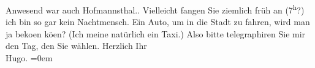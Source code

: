 \begin{ledgroupsized}[t]{13cm}
{{{                     Anwesend war auch Hofmannsthal.}}}\label{K_L02457_1h}. Vielleicht
                  {\pb}fangen Sie ziemlich früh an
                     (7\textsuperscript{h}?) ich bin so gar kein Nachtmensch.\pend
           \pstart
           Ein Auto, um in die Stadt zu fahren, wird man ja beko{\geminationm}en
                  kö{\geminationn}en? (Ich meine natürlich ein Taxi.)\pend
           \pstart
           Also bitte telegraphiren Sie mir den Tag, den Sie wählen.\pend
           \pstart
           Herzlich Ihr{\\[\baselineskip]}\spacefill\mbox{Hugo.}\pend
           \leftskip=0em{}\endnumbering{}\end{ledgroupsized}  \newcommand{\dateiname}{L02457}\newcommand{\titel}{Hugo Hofmannsthal an Arthur Schnitzler, 10. 12. 1925}\newcommand{\editorInnen}{Martin Anton Müller und Gerd-Hermann Susen}
      